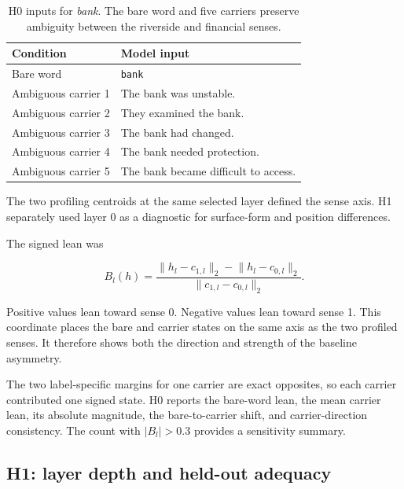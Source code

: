 \documentclass[conference]{IEEEtran}
\newcommand{\resultstableformat}{%
  \footnotesize
  \renewcommand{\arraystretch}{1.12}%
  \setlength{\extrarowheight}{0.7pt}%
}
\begin{document}
\begin{table}[!t]
  \centering
  \resultstableformat
  \caption{H0 inputs for \emph{bank}. The bare word and five carriers preserve
  ambiguity between the riverside and financial senses.}
  \label{tab:h0-bank-stimuli}
  \begin{tabular}{p{}p{}}
  \hline
  Condition & Model input \\
  \hline
  Bare word & \texttt{bank} \\
  Ambiguous carrier 1 & The bank was unstable. \\
  Ambiguous carrier 2 & They examined the bank. \\
  Ambiguous carrier 3 & The bank had changed. \\
  Ambiguous carrier 4 & The bank needed protection. \\
  Ambiguous carrier 5 & The bank became difficult to access. \\
  \hline
  \end{tabular}
\end{table}

The two profiling centroids at the same selected layer defined the sense axis.
H1 separately used layer 0 as a diagnostic for surface-form and position
differences.

The signed lean was

\begin{equation}
B_l(h)=
\frac{\lVert h_l-c_{1,l}\rVert_2-\lVert h_l-c_{0,l}\rVert_2}
{\lVert c_{1,l}-c_{0,l}\rVert_2}.
\label{eq:h0-bias}
\end{equation}

Positive values lean toward sense 0. Negative values lean toward sense 1.
This coordinate places the bare and carrier states on the same axis as the two
profiled senses. It therefore shows both the direction and strength of the
baseline asymmetry.

The two label-specific margins for one carrier are exact opposites, so each
carrier contributed one signed state. H0 reports the bare-word lean, the mean
carrier lean, its absolute magnitude, the bare-to-carrier shift, and
carrier-direction consistency. The count with $|B_l|>0.3$ provides a
sensitivity summary.

\subsection{H1: layer depth and held-out adequacy}
\label{sec:h1-method}
\end{document}
